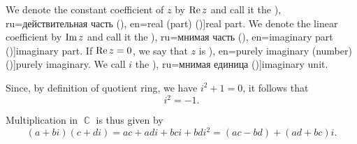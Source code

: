 \begin{definition}
  We denote the constant coefficient of \( z \) by \( \operatorname{Re} z \) and call it the \term[bg=реална част (\cite[296]{ИлинСадовничиСендов1984АнализТом1}), ru=действительная часть (\cite[12]{Маркушевич1967АналитическиеФункцииТом1}), en=real (part) (\cite[1]{Ahlfors1979ComplexAnalysis})]{real part}. We denote the linear coefficient by \( \operatorname{Im} z \) and call it the \term[bg=имагинерна част (\cite[296]{ИлинСадовничиСендов1984АнализТом1}), ru=мнимая часть (\cite[12]{Маркушевич1967АналитическиеФункцииТом1}), en=imaginary part (\cite[1]{Ahlfors1979ComplexAnalysis})]{imaginary part}. If \( \operatorname{Re} z = 0 \), we say that \( z \) is \term[ru=чисто мнимое (число) (\cite[12]{Маркушевич1967АналитическиеФункцииТом1}), en=purely imaginary (number) (\cite[1]{Ahlfors1979ComplexAnalysis})]{purely imaginary}. We call \( i \) the \term[en=imaginary unit (\cite[1]{Ahlfors1979ComplexAnalysis}), ru=мнимая единица (\cite[12]{Маркушевич1967АналитическиеФункцииТом1})]{imaginary unit}.

  Since, by definition of quotient ring, we have \( i^2 + 1 = 0 \), it follows that
  \begin{equation}\label{eq:def:complex_numbers/i_square}
    i^2 = -1.
  \end{equation}

  Multiplication in \( \BbbC \) is thus given by
  \begin{equation}\label{eq:def:complex_numbers/multiplication}
    (a + bi) (c + di) = ac + adi + bci + bdi^2 = (ac - bd) + (ad + bc) i.
  \end{equation}
\end{definition}
